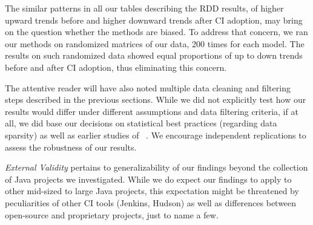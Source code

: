  The similar patterns in all our tables describing the RDD results, of higher upward trends before and higher downward trends after CI adoption, may bring on the question whether the methods are biased. To address that concern, we ran our methods on randomized matrices of our data, 200 times for each model. The results on such randomized data showed equal proportions of up to down trends before and after CI adoption, thus eliminating this concern.
 
 
The attentive reader will have also noted multiple data cleaning and filtering 
steps described in the previous sections.
While we did not explicitly test how our results would differ under different
assumptions and data filtering criteria, if at all, we did base our decisions on
statistical best practices (\eg regarding data sparsity) as well as 
earlier studies of \Tvis~\cite{era14,%
VasilescuYWDF15, yue2015wait, BellerGZ16, Hilton2016, Yu2016}.
We encourage independent replications to assess the robustness of our results.
 


\smallskip \emph{External Validity} pertains to generalizability of our findings 
beyond the collection of \GH Java projects we investigated.
While we do expect our findings to apply to other mid-sized to large Java projects,
this expectation might be threatened by peculiarities of other CI tools (\eg Jenkins, 
Hudson) as well as differences between open-source and proprietary projects, just
to name a few.

